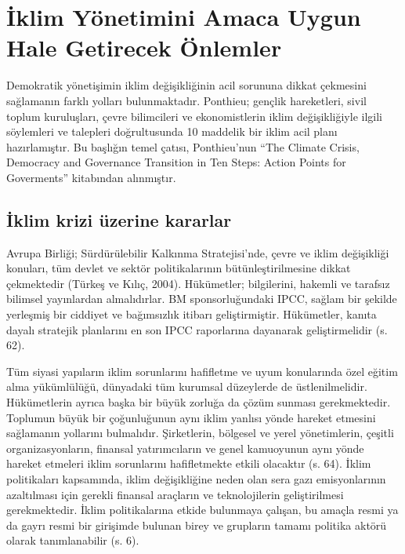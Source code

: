 \documentclass[
]{book}
\begin{document}
\hypertarget{iklim-yuxf6netimini-amaca-uygun-hale-getirecek-uxf6nlemler}{%
\section{İklim Yönetimini Amaca Uygun Hale Getirecek Önlemler}\label{iklim-yuxf6netimini-amaca-uygun-hale-getirecek-uxf6nlemler}}

Demokratik yönetişimin iklim değişikliğinin acil sorununa dikkat çekmesini sağlamanın farklı yolları bulunmaktadır. Ponthieu; gençlik hareketleri, sivil toplum kuruluşları, çevre bilimcileri ve ekonomistlerin iklim değişikliğiyle ilgili söylemleri ve talepleri doğrultusunda 10 maddelik bir iklim acil planı hazırlamıştır. Bu başlığın temel çatısı, Ponthieu'nun ``The Climate Crisis, Democracy and Governance Transition in Ten Steps: Action Points for Goverments'' kitabından alınmıştır.

\hypertarget{iklim-krizi-uxfczerine-kararlar}{%
\subsection{İklim krizi üzerine kararlar}\label{iklim-krizi-uxfczerine-kararlar}}

Avrupa Birliği; Sürdürülebilir Kalkınma Stratejisi'nde, çevre ve iklim değişikliği konuları, tüm devlet ve sektör politikalarının bütünleştirilmesine dikkat çekmektedir (Türkeş ve Kılıç, 2004). Hükümetler; bilgilerini, hakemli ve tarafsız bilimsel yayınlardan almalıdırlar. BM sponsorluğundaki IPCC, sağlam bir şekilde yerleşmiş bir ciddiyet ve bağımsızlık itibarı geliştirmiştir. Hükümetler, kanıta dayalı stratejik planlarını en son IPCC raporlarına dayanarak geliştirmelidir (s. 62). \citep{ponthieu2019climate}

Tüm siyasi yapıların iklim sorunlarını hafifletme ve uyum konularında özel eğitim alma yükümlülüğü, dünyadaki tüm kurumsal düzeylerde de üstlenilmelidir. Hükümetlerin ayrıca başka bir büyük zorluğa da çözüm sunması gerekmektedir. Toplumun büyük bir çoğunluğunun aynı iklim yanlısı yönde hareket etmesini sağlamanın yollarını bulmalıdır. Şirketlerin, bölgesel ve yerel yönetimlerin, çeşitli organizasyonların, finansal yatırımcıların ve genel kamuoyunun aynı yönde hareket etmeleri iklim sorunlarını hafifletmekte etkili olacaktır (s. 64). \citep{ponthieu2019climate} İklim politikaları kapsamında, iklim değişikliğine neden olan sera gazı emisyonlarının azaltılması için gerekli finansal araçların ve teknolojilerin geliştirilmesi gerekmektedir. İklim politikalarına etkide bulunmaya çalışan, bu amaçla resmi ya da gayrı resmi bir girişimde bulunan birey ve grupların tamamı politika aktörü olarak tanımlanabilir (s. 6). \citep{sahin2014turkiye}
\end{document}
